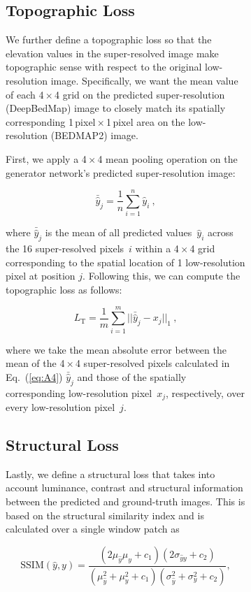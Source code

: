 \documentclass[tc, noline]{copernicus}
\begin{document}
\begin{figure}[t]
\begin{figure}[t]
\subsection{Topographic Loss}

We further define a topographic loss so that the elevation values in the super-resolved image make topographic sense with respect to the original low-resolution image.
Specifically, we want the mean value of each 4\,$\times$\,4 grid on the predicted super-resolution (DeepBedMap) image to closely match its spatially corresponding 1\,\unit{pixel}\,$\times$\,1\,\unit{pixel} area on the low-resolution (BEDMAP2) image.

First, we apply a 4\,$\times$\,4 mean pooling operation on the generator network's predicted super-resolution image:

\begin{equation}\label{eq:A4}
  \bar{\hat{y}}_j = \dfrac{1}{n} \sum\limits_{i=1}^n \hat{y}_i~,
\end{equation}

where $\bar{\hat{y}}_j$ is the mean of all predicted values~$\hat{y}_i$ across the 16 super-resolved pixels~$i$ within a 4\,$\times$\,4 grid corresponding to the spatial location of 1 low-resolution pixel at position $j$.
Following this, we can compute the topographic loss as follows:

\begin{equation}\label{eq:A5}
  L_{\mathrm{T}} = \dfrac{1}{m} \sum\limits_{i=1}^m ||\bar{\hat{y}}_j - x_j||_{1}~,
\end{equation}

where we take the mean absolute error between the mean of the 4\,$\times$\,4 super-resolved pixels calculated in Eq.~(\ref{eq:A4}) $\bar{\hat{y}}_j$ and those of the spatially corresponding low-resolution pixel~$x_j$, respectively, over every low-resolution pixel~$j$.

\subsection{Structural Loss}

Lastly, we define a structural loss that takes into account luminance, contrast and structural information between the predicted and ground-truth images.
This is based on the structural similarity index \citep[SSIM;][]{WangImageQualityAssessment2004} and is calculated over a single window patch as

\begin{equation}\label{eq:A6}
  \text{SSIM} (\hat{y}, y) = \dfrac{(2\mu_{\hat{y}}\mu_y + c_1)(2\sigma_{{\hat{y}}y} + c_2)}{(\mu_{\hat{y}}^2 + \mu_y^2 + c_1)(\sigma_{\hat{y}}^2 + \sigma_y^2 + c_2)},
\end{equation}


\end{figure}
\end{figure}
\end{document}
